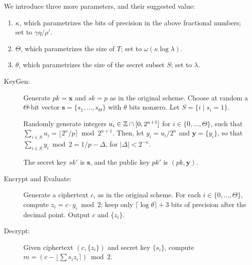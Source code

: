 We introduce three more parameters, and their suggested value:
\begin{enumerate}
\item $\kappa$, which parametrizes the bits of precision in the above fractional numbers; set to $\gamma \eta / \rho'$.
\item $\Theta$, which parametrizes the size of $T$; set to $\omega(\kappa \log \lambda)$.
\item $\theta$, which parametrizes the size of the secret subset $S$; set to $\lambda$.
\end{enumerate}

\begin{description}
\item[KeyGen:] Generate $pk = \mathbf{x}$ and $sk = p$ as in the original scheme. Choose at random a $\Theta$-bit vector $\mathbf{s} = \{s_1, \dots, s_\Theta\}$ with $\theta$ bits nonzero. Let $S = \{i \mid s_i = 1\}$.

Randomly generate integers $u_i \in \mathbb{Z} \cap [0, 2^{\kappa + 1}]$ for $i \in \{0, \dots, \Theta\}$, such that $\sum_{i \in S} u_i = \lfloor 2^\kappa / p \rceil \bmod 2^{\kappa + 1}.$
Then, let $y_i = u_i / 2^\kappa$ and $\mathbf{y} = \{y_i\}$, so that $\sum_{i \in S} y_i \bmod 2 = 1/p - \Delta$, for $|\Delta| < 2^{-\kappa}$.

The secret key $sk'$ is $\mathbf{s}$, and the public key $pk'$ is $(pk, \mathbf{y})$.

\item[Encrypt and Evaluate:] Generate a ciphertext $c$, as in the original scheme. For each $i \in \{0, \dots, \Theta\}$, compute $z_i = c \cdot y_i \bmod 2$; keep only $\lceil \log \theta \rceil + 3$ bits of precision after the decimal point. Output $c$ and $\{z_i\}$.
\item[Decrypt:] Given ciphertext $(c, \{z_i\})$ and secret key $\{s_i\}$, compute $m = (c - \lfloor \sum s_i z_i \rceil) \bmod 2$.
\end{description}


